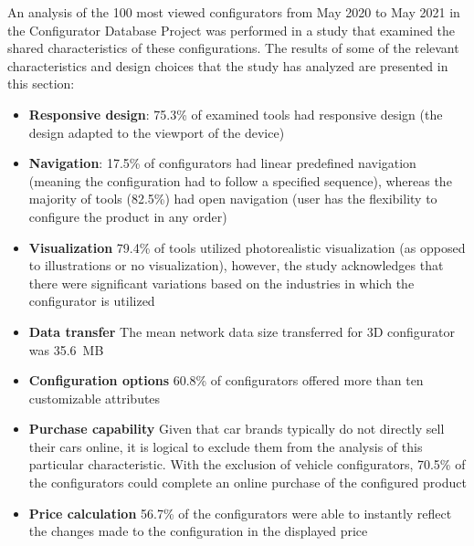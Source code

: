 An analysis of the 100 most viewed configurators from May 2020 to May 2021 in the Configurator Database Project was performed in a study that examined the shared characteristics of these configurations. The results of some of the relevant characteristics and design choices that the study has analyzed are presented in this section: \cite{Blazek2023}
\begin{itemize}
    \item \textbf{Responsive design}: 75.3\% of examined tools had responsive design (the design adapted to the viewport of the device) 
    \item \textbf{Navigation}: 17.5\% of configurators had linear predefined navigation (meaning the configuration had to follow a specified sequence), whereas the majority of tools (82.5\%) had open navigation (user has the flexibility to configure the product in any order)
    \item \textbf{Visualization} 79.4\% of tools utilized photorealistic visualization (as opposed to illustrations or no visualization), however, the study acknowledges that there were significant variations based on the industries in which the configurator is utilized
    \item \textbf{Data transfer} The mean network data size transferred for 3D configurator was 35.6~MB
    \item \textbf{Configuration options} 60.8\% of configurators offered more than ten customizable attributes
    \item \textbf{Purchase capability} Given that car brands typically do not directly sell their cars online, it is logical to exclude them from the analysis of this particular characteristic. With the exclusion of vehicle configurators, 70.5\% of the configurators could complete an online purchase of the configured product
    \item \textbf{Price calculation} 56.7\% of the configurators were able to instantly reflect the changes made to the configuration in the displayed price
\end{itemize}

